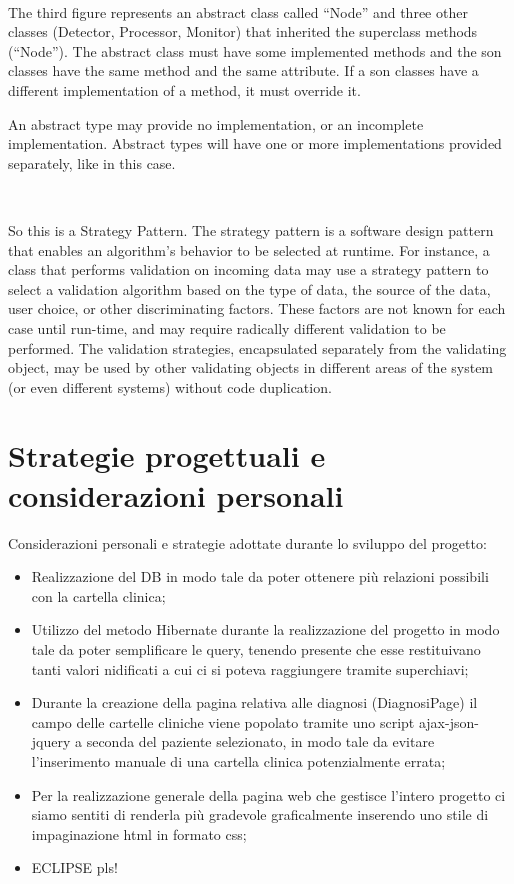 \documentclass[a4paper,titlepage]{article}
\begin{document}
~

The third figure represents an abstract class called ``Node'' and three other classes (Detector, Processor, Monitor) that inherited the superclass methods (``Node''). The abstract class must have some implemented methods and the son classes have the same method and the same attribute. If a son classes have a different implementation of a method, it must override it.

An abstract type may provide no implementation, or an incomplete implementation. Abstract types will have one or more implementations provided separately, like in this case.

~

So this is a Strategy Pattern. The strategy pattern is a software design pattern that enables an algorithm's behavior to be selected at runtime. For instance, a class that performs validation on incoming data may use a strategy pattern to select a validation algorithm based on the type of data, the source of the data, user choice, or other discriminating factors. These factors are not known for each case until run-time, and may require radically different validation to be performed. The validation strategies, encapsulated separately from the validating object, may be used by other validating objects in different areas of the system (or even different systems) without code duplication.

\newpage
\part{Strategie progettuali e considerazioni personali}

Considerazioni personali e strategie adottate durante lo sviluppo del progetto:

\begin{itemize}[leftmargin=1.5cm, topsep=0.5cm, itemsep=0.2cm]

\item Realizzazione del DB in modo tale da poter ottenere più relazioni possibili con la cartella clinica;
\item Utilizzo del metodo Hibernate durante la realizzazione del progetto in modo tale da poter semplificare le query, tenendo presente che esse restituivano tanti valori nidificati a cui ci si poteva raggiungere tramite superchiavi;
\item Durante la creazione della pagina relativa alle diagnosi (DiagnosiPage) il campo delle cartelle cliniche viene popolato tramite uno script ajax-json-jquery a seconda del paziente selezionato, in modo tale da evitare l'inserimento manuale di una cartella clinica potenzialmente errata;
\item Per la realizzazione generale della pagina web che gestisce l'intero progetto ci siamo sentiti di renderla più gradevole graficalmente inserendo uno stile di impaginazione html in formato css;
\item ECLIPSE pls!

\end{itemize}
\end{document}
